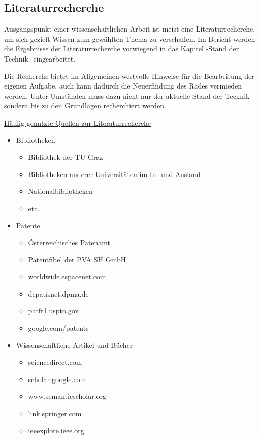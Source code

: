 \newpage


\subsection{Literaturrecherche}

Ausgangspunkt einer wissenschaftlichen Arbeit ist meist eine Literaturrecherche, um sich gezielt Wissen zum gewählten Thema zu verschaffen. Im Bericht werden die Ergebnisse der Literaturrecherche vorwiegend in das Kapitel -Stand der Technik- eingearbeitet.


Die Recherche bietet im Allgemeinen wertvolle Hinweise für die Bearbeitung der eigenen Aufgabe, auch kann dadurch die {\glqq}Neuerfindung des Rades{\grqq} vermieden werden. Unter Umständen muss dazu nicht nur der aktuelle Stand der Technik sondern bis zu den Grundlagen recherchiert werden. 


\underline{Häufig genutzte Quellen zur Literaturrecherche}
\begin{itemize}
    \item Bibliotheken
    \begin{itemize}
        \item Bibliothek der TU Graz
        \item Bibliotheken anderer Universitäten im In- und Ausland
        \item Nationalbibliotheken
        \item etc.
    \end{itemize}
     \item Patente
    \begin{itemize}
        \item Österreichisches Patenamt
        \item {\glqq}Patentfibel{\grqq} der PVA SH GmbH
        \item worldwide.espacenet.com
        \item depatisnet.dpma.de
        \item patft1.uspto.gov
        \item google.com/patents
    \end{itemize}
    \item Wissenschaftliche Artikel und Bücher
    \begin{itemize}
        \item sciencedirect.com
        \item scholar.google.com
        \item www.semanticscholar.org
        \item link.springer.com
        \item ieeexplore.ieee.org
    \end{itemize}    
\end{itemize}

